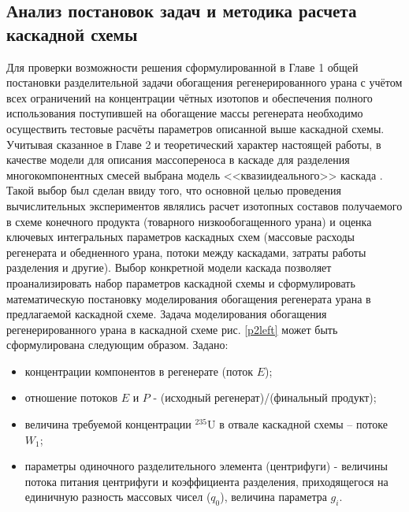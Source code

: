 
\subsection{Анализ постановок задач и методика расчета каскадной схемы}\label{statement}

Для проверки возможности решения сформулированной в Главе 1 общей постановки разделительной задачи обогащения регенерированного урана с учётом всех ограничений на концентрации чётных изотопов и обеспечения полного использования поступившей на обогащение массы регенерата необходимо осуществить тестовые расчёты параметров описанной выше каскадной схемы. 
Учитывая сказанное в Главе 2 и теоретический характер настоящей работы, в качестве модели для описания массопереноса в каскаде для разделения многокомпонентных смесей выбрана модель <<квазиидеального>> каскада \cite{sazykinKvaziidealnyeKaskadyDlya2000}. Такой выбор был сделан ввиду того, что основной целью проведения вычислительных экспериментов являлись расчет изотопных составов получаемого в схеме конечного продукта (товарного низкообогащенного урана) и оценка ключевых интегральных параметров каскадных схем (массовые расходы регенерата и обедненного урана, потоки между каскадами, затраты работы разделения и другие). Выбор конкретной модели каскада позволяет проанализировать набор параметров каскадной схемы и сформулировать математическую постановку моделирования обогащения регенерата урана в предлагаемой каскадной схеме.
Задача моделирования обогащения регенерированного урана в каскадной схеме рис. \ref{p2left} может быть сформулирована следующим образом.
Задано:

\begin{itemize}
    \item концентрации компонентов в регенерате (поток $E$); 
    \item отношение потоков $E$ и $P$ - (исходный регенерат)/(финальный продукт);
    \item величина требуемой концентрации $^{235}$U в отвале каскадной схемы – потоке $W_{1}$;
    \item параметры одиночного разделительного элемента (центрифуги) - величины потока питания центрифуги и коэффициента разделения, приходящегося на единичную разность массовых чисел ($q_{0}$), величина параметра $g_{i}$.
\end{itemize}

